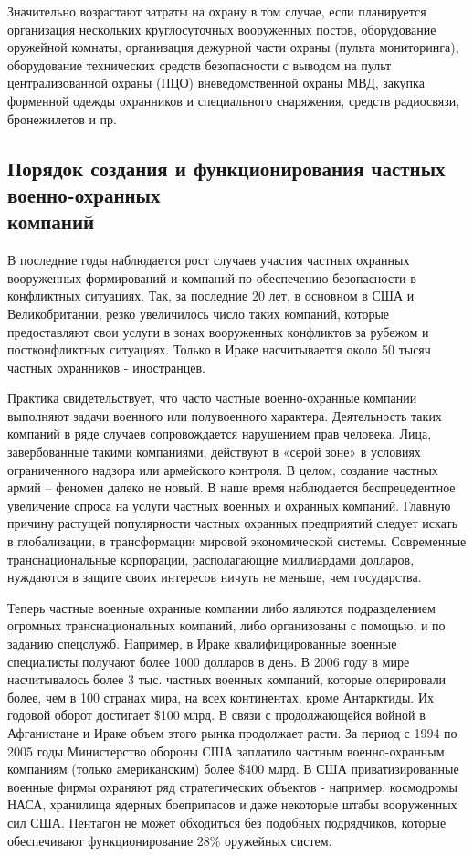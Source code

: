 \documentclass[a4paper,12pt,fleqn]{article} %
\begin{document}
Значительно возрастают затраты на охрану в том случае, если планируется организация нескольких круглосуточных вооруженных постов, оборудование оружейной комнаты, организация дежурной части охраны (пульта мониторинга), оборудование технических средств безопасности с выводом на пульт централизованной охраны (ПЦО) вневедомственной охраны МВД, закупка форменной одежды охранников и специального снаряжения, средств радиосвязи, бронежилетов и пр.

\subsection{Порядок создания и функционирования частных военно-охранных \\компаний}

В последние годы наблюдается рост случаев участия частных охранных вооруженных формирований и компаний по обеспечению безопасности в конфликтных ситуациях. Так, за последние 20 лет, в основном в США и Великобритании, резко увеличилось число таких компаний, которые предоставляют свои услуги в зонах вооруженных конфликтов за рубежом и постконфликтных ситуациях. Только в Ираке насчитывается около 50 тысяч частных охранников - иностранцев.
	
Практика свидетельствует, что часто частные военно-охранные компании выполняют задачи военного или полувоенного характера. Деятельность таких компаний в ряде случаев сопровождается нарушением прав человека. Лица, завербованные такими компаниями, действуют в «серой зоне» в условиях ограниченного надзора или армейского контроля. В целом, создание частных армий – феномен далеко не новый. В наше время наблюдается беспрецедентное увеличение спроса на услуги частных военных и охранных компаний. Главную причину растущей популярности частных охранных предприятий следует искать в глобализации, в трансформации мировой экономической системы. Современные транснациональные корпорации, располагающие миллиардами долларов, нуждаются в защите своих интересов ничуть не меньше, чем государства.  

Теперь частные военные охранные компании либо являются подразделением огромных транснациональных компаний, либо организованы с помощью, и по заданию спецслужб. Например, в Ираке квалифицированные военные специалисты получают более 1000 долларов в день. В 2006 году в мире насчитывалось более 3 тыс. частных военных компаний, которые оперировали более, чем в 100 странах мира, на всех континентах, кроме Антарктиды. Их годовой оборот достигает \$100 млрд. В связи с продолжающейся войной в Афганистане и Ираке объем этого рынка продолжает расти. За период с 1994 по 2005 годы Министерство обороны США заплатило частным военно-охранным компаниям (только американским) более \$400 млрд. В США приватизированные военные фирмы охраняют ряд стратегических объектов - например, космодромы НАСА, хранилища ядерных боеприпасов и даже некоторые штабы вооруженных сил США. Пентагон не может обходиться без подобных подрядчиков, которые обеспечивают функционирование 28\% оружейных систем. 
\end{document}
